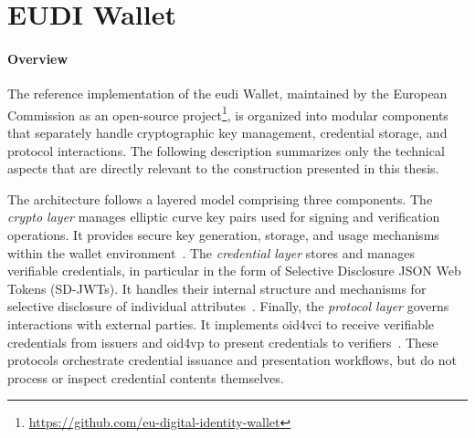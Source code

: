 \section{EUDI Wallet}
\label{sec:eudi-wallet}


\paragraph{Overview}
The reference implementation of the \acrshort{eudi} Wallet, maintained by the European Commission as an open-source project\footnote{\url{https://github.com/eu-digital-identity-wallet}},
is organized into modular components that separately handle cryptographic key management, credential storage, and protocol interactions. The following description summarizes only the technical aspects that are directly relevant to the construction presented in this thesis. 

The architecture follows a layered model comprising three components. The \emph{crypto layer} manages elliptic curve key pairs used for signing and verification operations. It provides secure key generation, storage, and usage mechanisms within the wallet environment~\cite{EUDI-ARF}. The \emph{credential layer} stores and manages verifiable credentials, in particular in the form of Selective Disclosure JSON Web Tokens (SD-JWTs). It handles their internal structure and mechanisms for selective disclosure of individual attributes~\cite{IETF-SDJWT-07}. Finally, the \emph{protocol layer} governs interactions with external parties. 
It implements \acrfull{oid4vci} to receive verifiable credentials from issuers and \acrfull{oid4vp} to present credentials to verifiers~\cite{openid-4-verifiable-credential-issuance-1_0,openid-4-verifiable-presentations-1_0}. These protocols orchestrate credential issuance and presentation workflows, but do not process or inspect credential contents themselves.

